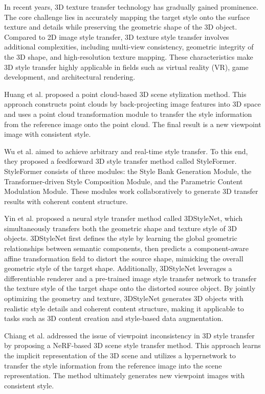 \documentclass[preprint,12pt]{elsarticle}
\begin{document}
In recent years, 3D texture transfer technology has gradually gained prominence. The core challenge lies in accurately mapping the target style onto the surface texture and details while preserving the geometric shape of the 3D object. Compared to 2D image style transfer, 3D texture style transfer involves additional complexities, including multi-view consistency, geometric integrity of the 3D shape, and high-resolution texture mapping. These characteristics make 3D style transfer highly applicable in fields such as virtual reality (VR), game development, and architectural rendering.

Huang et al.\citep{87huang2021learning} proposed a point cloud-based 3D scene stylization method. This approach constructs point clouds by back-projecting image features into 3D space and uses a point cloud transformation module to transfer the style information from the reference image onto the point cloud. The final result is a new viewpoint image with consistent style.

Wu et al.\citep{88wu2021styleformer} aimed to achieve arbitrary and real-time style transfer. To this end, they proposed a feedforward 3D style transfer method called StyleFormer. StyleFormer consists of three modules: the Style Bank Generation Module, the Transformer-driven Style Composition Module, and the Parametric Content Modulation Module. These modules work collaboratively to generate 3D transfer results with coherent content structure.

Yin et al.\citep{89yin20213dstylenet} proposed a neural style transfer method called 3DStyleNet, which simultaneously transfers both the geometric shape and texture style of 3D objects. 3DStyleNet first defines the style by learning the global geometric relationships between semantic components, then predicts a component-aware affine transformation field to distort the source shape, mimicking the overall geometric style of the target shape. Additionally, 3DStyleNet leverages a differentiable renderer and a pre-trained image style transfer network to transfer the texture style of the target shape onto the distorted source object. By jointly optimizing the geometry and texture, 3DStyleNet generates 3D objects with realistic style details and coherent content structure, making it applicable to tasks such as 3D content creation and style-based data augmentation.

Chiang et al.\citep{90chiang2022stylizing} addressed the issue of viewpoint inconsistency in 3D style transfer by proposing a NeRF-based 3D scene style transfer method. This approach learns the implicit representation of the 3D scene and utilizes a hypernetwork to transfer the style information from the reference image into the scene representation. The method ultimately generates new viewpoint images with consistent style.
\end{document}
